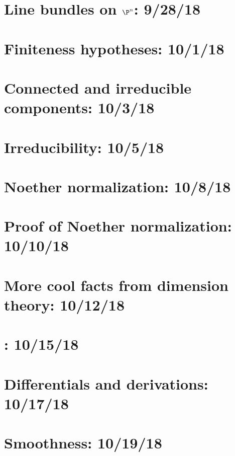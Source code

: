 \documentclass{notes_d}
\begin{document}
\section{Line bundles on $\P^n$: 9/28/18}
	
\section{Finiteness hypotheses: 10/1/18}
	
\section{Connected and irreducible components: 10/3/18}
	
\section{Irreducibility: 10/5/18}
	
\section{Noether normalization: 10/8/18}
	
\section{Proof of Noether normalization: 10/10/18}
	
\section{More cool facts from dimension theory: 10/12/18}
	
\section{: 10/15/18}
\section{Differentials and derivations: 10/17/18}
	
\section{Smoothness: 10/19/18}
	
\end{document}
